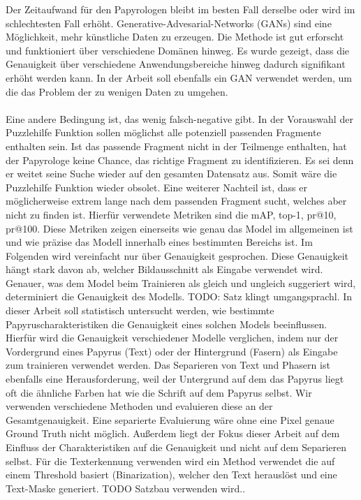\documentclass[12pt,a4paper]{article}
\begin{document}
Der Zeitaufwand für den Papyrologen bleibt im besten Fall derselbe oder wird im schlechtesten Fall erhöht. Generative-Advesarial-Networks (GANs) sind eine Möglichkeit, mehr künstliche Daten zu erzeugen.  Die Methode ist gut erforscht und funktioniert über verschiedene Domänen hinweg. Es wurde gezeigt, dass die Genauigkeit über verschiedene Anwendungsbereiche hinweg dadurch signifikant erhöht werden kann. In der Arbeit soll ebenfalls ein GAN verwendet werden, um die das Problem der zu wenigen Daten zu umgehen. 
\\\\
Eine andere Bedingung ist, das wenig falsch-negative gibt.
In der Vorauswahl der Puzzlehilfe Funktion sollen möglichst alle potenziell passenden Fragmente enthalten sein. Ist das passende Fragment nicht in der Teilmenge enthalten, hat der Papyrologe keine Chance, das richtige Fragment zu identifizieren. Es sei denn er weitet seine Suche wieder auf den gesamten Datensatz aus. Somit wäre die Puzzlehilfe Funktion wieder obsolet. Eine weiterer Nachteil ist, dass er möglicherweise extrem lange nach dem passenden Fragment sucht, welches aber nicht zu finden ist. 
Hierfür verwendete Metriken sind die mAP, top-1, pr@10, pr@100. Diese Metriken zeigen einerseits wie genau das Model im allgemeinen ist und wie präzise das Modell innerhalb eines bestimmten Bereichs ist. Im Folgenden wird vereinfacht nur über Genauigkeit gesprochen. Diese Genauigkeit hängt stark davon ab, welcher Bildausschnitt als Eingabe verwendet wird. Genauer, was dem Model beim Trainieren als gleich und ungleich suggeriert wird, determiniert die Genauigkeit des Modells. TODO: Satz klingt umgangsprachl.
In dieser Arbeit soll statistisch untersucht werden, wie bestimmte Papyruscharakteristiken die Genauigkeit eines solchen Models beeinflussen. Hierfür wird die Genauigkeit verschiedener Modelle verglichen, indem nur der Vordergrund eines Papyrus (Text) oder der Hintergrund (Fasern) als Eingabe zum trainieren verwendet werden. 
Das Separieren von Text und Phasern ist ebenfalls eine Herausforderung, weil der Untergrund auf dem das Papyrus liegt oft die ähnliche Farben hat wie die Schrift auf dem Papyrus selbst. 
Wir verwenden verschiedene Methoden und evaluieren diese an der Gesamtgenauigkeit. Eine separierte Evaluierung wäre ohne eine Pixel genaue Ground Truth nicht möglich. Außerdem liegt der Fokus dieser Arbeit auf dem Einfluss der Charakteristiken auf die Genauigkeit und nicht auf dem Separieren selbst. Für die Texterkennung verwenden wird ein Method verwendet die auf einem Threshold basiert (Binarization), welcher den Text herauslöst und eine Text-Maske generiert. TODO Satzbau verwenden wird..
\end{document}
